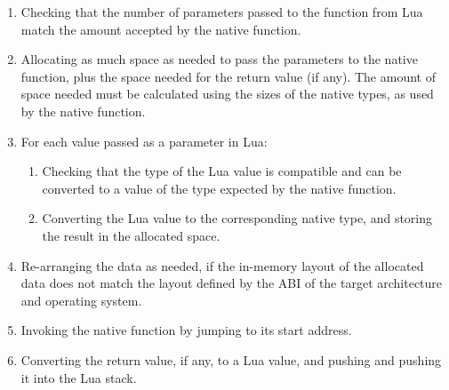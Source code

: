 \begin{enumerate}

	\item Checking that the number of parameters passed to the function from Lua
	match the amount accepted by the native function.

	\item Allocating as much space as needed to pass the parameters to
	the native function, plus the space needed for the return value (if any).
	The amount of space needed must be calculated using the sizes of the native
	types, as used by the native function.

	\item For each value passed as a parameter in Lua:

		\begin{enumerate}

			\item Checking that the type of the Lua value is compatible and can be
			converted to a value of the type expected by the native function.

			\item Converting the Lua value to the corresponding native type, and
				storing the result in the allocated space.

		\end{enumerate}

	\item Re-arranging the data as needed, if the in-memory layout of the
		allocated data does not match the layout defined by the \gls{ABI} of the
		target architecture and operating system.

	\item Invoking the native function by jumping to its start address.

	\item Converting the return value, if any, to a Lua value, and pushing
		and pushing it into the Lua stack.

\end{enumerate}


\beforeintro
